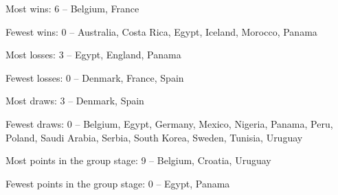 \begin{questions}
\begin{solution}

Most wins: 6 – Belgium, France

Fewest wins: 0 – Australia, Costa Rica, Egypt, Iceland, Morocco, Panama

Most losses: 3 – Egypt, England, Panama

Fewest losses: 0 – Denmark, France, Spain

Most draws: 3 – Denmark, Spain

Fewest draws: 0 – Belgium, Egypt, Germany, Mexico, Nigeria, Panama, Peru, Poland, Saudi Arabia, Serbia, South Korea, Sweden, Tunisia, Uruguay

Most points in the group stage: 9 – Belgium, Croatia, Uruguay

Fewest points in the group stage: 0 – Egypt, Panama

\end{solution}
\end{questions}

